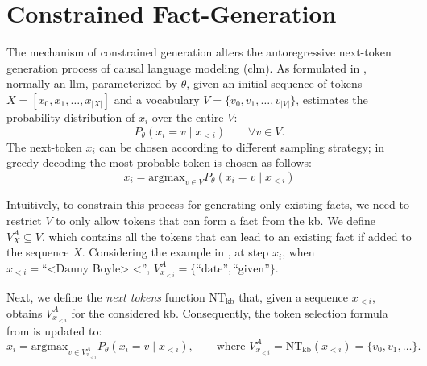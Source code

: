\section{Constrained Fact-Generation}
\label{sec:constrained-gen}

The mechanism of constrained generation alters the autoregressive next-token generation process of causal language modeling (\acs{clm}). As formulated in 
, normally an \ac{llm}, parameterized by $\theta$, given an initial sequence of tokens $X = [x_0, x_1, \ldots, x_{|X|}]$ and a vocabulary $V = \{v_0, v_1, \ldots, v_{|V|}\}$, estimates the probability distribution of $x_i$ over the entire $V$:
\begin{equation}
    P_\theta(x_i = v \mid x_{<i}) \qquad \forall v \in V.
\end{equation}
The next-token $x_i$ can be chosen according to different sampling strategy;
in greedy decoding the most probable token is chosen as follows:
%
\begin{equation}
    x_i = \text{argmax}_{v \in V}P_\theta(x_i = v\mid x_{<i})
    \label{eq:token_selection}
\end{equation}

Intuitively, to constrain this process for generating only existing facts, we need to restrict $V$ to only allow tokens that can form a fact from the \ac{kb}. We define $V^A_{X} \subseteq V$, which contains all the tokens that can lead to an existing fact if added to the sequence $X$. Considering the example in , at step $x_i$, when $x_{<i}=\text{``<Danny Boyle> <''}$, $V^A_{x_{<i}} = \{\text{``date''}, \text{``given''}\}$.




Next, we define the \textit{next tokens} function $\mathrm{NT}_{\mathrm{kb}}$ that, given a sequence $x_{<i}$, obtains $V^A_{x_{<i}}$ for the considered \ac{kb}.
%
Consequently, the token selection formula from  is updated to:
\begin{equation}
    x_i = \text{argmax}_{v \in V^A_{x_{<i}}}P_\theta(x_i = v \mid x_{<i}), \qquad \text{where }
    V^A_{x_{<i}} = \mathrm{NT}_{\mathrm{kb}}(x_{<i}) = \{v_0,v_1,\ldots\}.
\end{equation}

